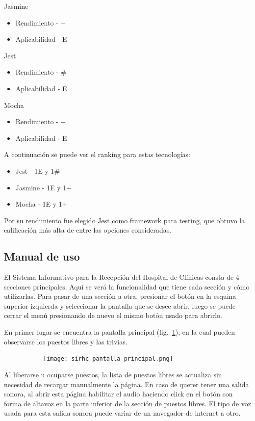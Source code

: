 \documentclass{article}
\begin{document}
Jasmine
\begin{itemize}
    \item Rendimiento - +
    \item Aplicabilidad - E
\end{itemize}
Jest
\begin{itemize}
    \item Rendimiento - \#
    \item Aplicabilidad - E 
\end{itemize}
Mocha
\begin{itemize}
    \item Rendimiento - +
    \item Aplicabilidad - E
\end{itemize}
A continuación se puede ver el ranking para estas tecnologías:
\begin{itemize}
    \item Jest -  1E y 1\#
    \item Jasmine - 1E y 1+
    \item Mocha - 1E y 1+
\end{itemize}
Por su rendimiento fue elegido Jest como framework para testing, que obtuvo la calificación más alta de entre las opciones consideradas.
\newpage
\subsection{Manual de uso}
El Sistema Informativo para la Recepción del Hospital de Clínicas consta de 4 secciones principales. Aquí se verá la funcionalidad que tiene cada sección y cómo utilizarlas. Para pasar de una sección a otra, presionar el botón en la esquina superior izquierda y seleccionar la pantalla que se desee abrir, luego se puede cerrar el menú presionando de nuevo el mismo botón usado para abrirlo.

En primer lugar se encuentra la pantalla principal (fig.~\ref{fig:pantallaPrincipalManual}), en la cual pueden observarse los puestos libres y las trivias.
\begin{figure}[H]
	\caption{Interfaz de la pantalla principal del sistema}
    \begin{subfigure}{1\textwidth}
	\texttt{[image: sirhc pantalla principal.png]}
    \end{subfigure}
	\label{fig:pantallaPrincipalManual}
\end{figure}
\vspace{-1.0\baselineskip}

Al liberarse u ocuparse puestos, la lista de puestos libres se actualiza sin necesidad de recargar manualmente la página. En caso de querer tener una salida sonora, al abrir esta página habilitar el audio haciendo click en el botón con forma de altavoz en la parte inferior de la sección de puestos libres. El tipo de voz usada para esta salida sonora puede variar de un navegador de internet a otro.
\end{document}
